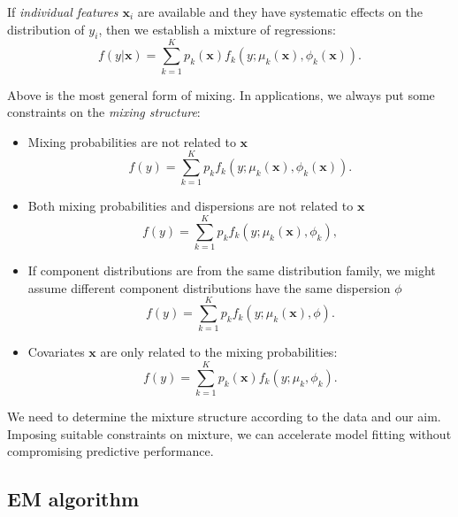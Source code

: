\documentclass[11pt]{article}
\numberwithin{equation}{section}
\def\bx{\boldsymbol{x}}
\begin{document}
	If {\it individual features $\bx_i$} are available and they have systematic effects on the distribution of $y_i$, then we establish a mixture of regressions:
	$$f(y|\bx)=\sum_{k=1}^Kp_k(\bx)f_k(y;\mu_k(\bx),\phi_k(\bx)).$$
	
	Above is the most general form of mixing. In applications, we always put some constraints on the \textit{mixing structure}:
	
	\begin{itemize}
		\item Mixing probabilities are not related to $\bx$
		$$f(y)=\sum_{k=1}^Kp_kf_k(y;\mu_k(\bx),\phi_k(\bx)).$$
		\item Both mixing probabilities and dispersions are not related to $\bx$
		$$f(y)=\sum_{k=1}^Kp_kf_k(y;\mu_k(\bx),\phi_k),$$

		\item If component distributions are from the same distribution family, we might assume different component distributions have the same dispersion $\phi$
		$$f(y)=\sum_{k=1}^Kp_kf_k(y;\mu_k(\bx),\phi).$$
		\item Covariates $\bx$ are only related to the mixing probabilities:
		$$f(y)=\sum_{k=1}^Kp_k(\bx)f_k(y;\mu_k,\phi_k).$$
	\end{itemize}
	
	We need to determine the mixture structure according to the data and our aim. Imposing suitable constraints on mixture, we can {accelerate model fitting} without compromising predictive performance.

\subsection{EM algorithm}
\end{document}
